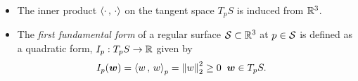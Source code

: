 \documentclass[11pt]{article}
\begin{document}
\begin{itemize}
\item  The inner product $\left\langle \cdot\,,\, \cdot \right\rangle$ on the tangent space $T_{p}S$ is induced from ${\mathbb R}^{3}$. 

\item   \begin{definition}
The \emph{first fundamental form} of a regular surface ${\mathcal S}\subset {\mathbb R}^{3}$ at $p\in {\mathcal S}$ is defined as a  quadratic form,  $I_{p}: T_{p}S \rightarrow {\mathbb R}$ given by 
\begin{align*}
I_{p}(\boldsymbol{w}) &= \left\langle w\,,\, w \right\rangle_{p} = \left\|w\right\|_{2}^{2} \ge 0\; \; \boldsymbol{w}\in T_{p}S.
\end{align*}
 \end{definition} 
\end{itemize}
\end{document}
